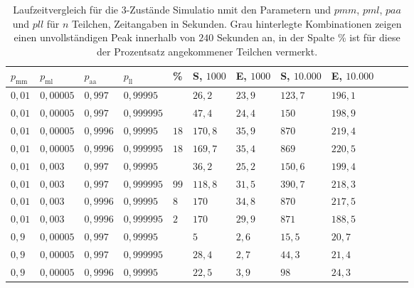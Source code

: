 \begin{table}[h]
\centering 
\caption[Laufzeitvergleich für die 3-Zustände Simulation]{Laufzeitvergleich für die 3-Zustände Simulatio nmit den Parametern und $pmm$, $pml$, $paa$ und $pll$ für $n$ Teilchen, Zeitangaben in Sekunden. Grau hinterlegte Kombinationen zeigen einen unvollständigen Peak innerhalb von $240$ Sekunden an, in der Spalte \% ist für diese der Prozentsatz angekommener Teilchen vermerkt.}
\label{3s_laufzeit}
\begin{tabular}{|l|l|l|l|l|l|l|l|l|l|l|l|}
\hline
$p_\text{mm}$ & $p_\text{ml}$ & $p_\text{aa}$ & $p_\text{ll}$ & \%& S, $1000$ & E, $1000$ & S, $10.000$ & E, $10.000$ \\ \hline \hline
$ 0,01 $ & $0,00005$ & $0,997$  & $0,99995$  && $26,2   $ & $23,9  $ & $123,7 $ & $196,1 $  \\ \hline
$ 0,01 $ & $0,00005$ & $0,997$  & $0,999995$ && $47,4   $ & $24,4  $ & $150   $ & $198,9 $  \\ \hline
\cellcolor{gray!25}$ 0,01 $ & \cellcolor{gray!25}$0,00005$ &\cellcolor{gray!25} $0,9996$ &\cellcolor{gray!25} $0,99995$  &$18$& $170,8 $ & $35,9  $ & $870   $ & $219,4 $  \\ \hline
\cellcolor{gray!25}$ 0,01 $ & \cellcolor{gray!25}$0,00005$ &\cellcolor{gray!25} $0,9996$ & \cellcolor{gray!25}$0,999995$ &$18$& $169,7 $ & $35,4  $ & $869   $ & $220,5 $  \\ \hline
$ 0,01 $ & $0,003 $  & $0,997$  & $0,99995$  && $36,2   $ & $25,2  $ & $150,6 $ & $199,4 $  \\ \hline
\cellcolor{gray!25}$ 0,01 $ & \cellcolor{gray!25}$0,003 $  & \cellcolor{gray!25}$0,997$  & \cellcolor{gray!25}$0,999995$ &$99$& $118,8$ & $31,5  $ & $390,7 $ & $218,3 $  \\ \hline
\cellcolor{gray!25}$ 0,01 $ & \cellcolor{gray!25}$0,003 $  & \cellcolor{gray!25}$0,9996$ & \cellcolor{gray!25}$0,99995$  &$8$& $170   $ & $34,8  $ & $870   $ & $217,5 $  \\ \hline
\cellcolor{gray!25}$ 0,01 $ & \cellcolor{gray!25}$0,003 $  & \cellcolor{gray!25}$0,9996$ & \cellcolor{gray!25}$0,999995$ &$2$& $170   $ & $29,9  $ & $871   $ & $188,5 $  \\ \hline
$ 0,9  $ & $0,00005$ & $0,997$  & $0,99995$  && $5      $ & $2,6 $   & $15,5  $ & $20,7 $  \\ \hline
$ 0,9  $ & $0,00005$ & $0,997$  & $0,999995$ && $28,4   $ & $2,7 $   & $44,3  $ & $21,4 $  \\ \hline
$ 0,9  $ & $0,00005$ & $0,9996$ & $0,99995$  && $22,5   $ & $3,9 $   & $98    $ & $24,3 $  \\ \hline

\end{tabular}
\end{table}
